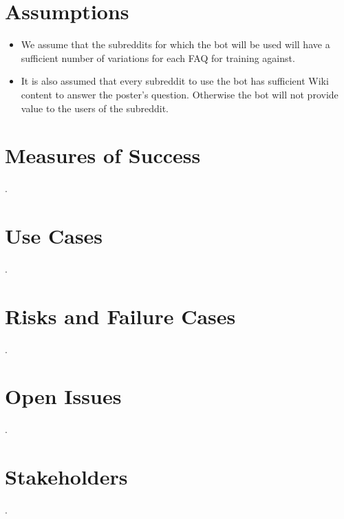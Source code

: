 \documentclass[dvips,12pt]{article}
\begin{document}
\section{Assumptions}

\begin{itemize}
\item We assume that the subreddits for which the bot will be used will have a sufficient number of variations for each FAQ for training against.
\item It is also assumed that every subreddit to use the bot has sufficient Wiki content to answer the poster's question. Otherwise the bot will not provide value to the users of the subreddit.
\end{itemize}

\section{Measures of Success}

.

\section{Use Cases}

.

\section{Risks and Failure Cases}

.

\section{Open Issues}

.

\section{Stakeholders}

.
\end{document}

